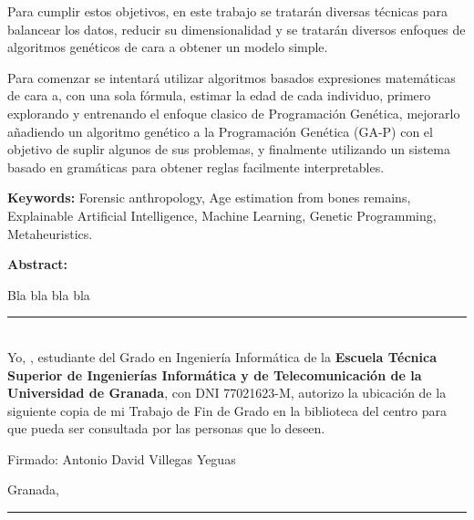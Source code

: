 Para cumplir estos objetivos, en este trabajo se tratarán diversas técnicas para balancear los datos, reducir su dimensionalidad y se tratarán diversos enfoques de algoritmos genéticos de cara a obtener un modelo simple.

Para comenzar se intentará utilizar algoritmos basados expresiones matemáticas de cara a, con una sola fórmula, estimar la edad de cada individuo, primero explorando y entrenando el enfoque clasico de Programación Genética, mejorarlo añadiendo un algoritmo genético a la Programación Genética (GA-P) con el objetivo de suplir algunos de sus problemas, y finalmente utilizando un sistema basado en gramáticas para obtener reglas facilmente interpretables.

\newpage


\begin{center}
	{\large\textbf{\thetitleEN}}


	\theauthor
\end{center}

\textbf{Keywords:} Forensic anthropology, Age estimation from bones remains, Explainable Artificial Intelligence,
Machine Learning, Genetic Programming, Metaheuristics.

\textbf{Abstract:}

Bla bla bla bla

\newpage

\vspace*{2cm}

\rule{\linewidth}{1 mm} \\[1 cm]

{\large Yo, \textbf{\theauthor}, estudiante del Grado en Ingeniería Informática de la \textbf{Escuela Técnica Superior de Ingenierías Informática y de Telecomunicación de la Universidad de Granada}, con DNI 77021623-M, autorizo la ubicación de la siguiente copia de mi Trabajo de Fin de Grado en la biblioteca del centro para que pueda ser consultada por las personas que lo deseen.}

\vspace{7cm}

Firmado: Antonio David Villegas Yeguas

\vspace{2cm}

Granada, \thedate



\newpage

\vspace*{2cm}

\rule{\linewidth}{1 mm} \\[1 cm]

